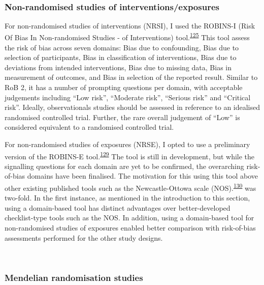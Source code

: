 \documentclass[a4paper, twoside]{templates/ociamthesis}
\begin{document}
~

\hypertarget{non-randomised-studies-of-interventionsexposures}{%
\subsubsection{Non-randomised studies of interventions/exposures}\label{non-randomised-studies-of-interventionsexposures}}

For non-randomised studies of interventions (NRSI), I used the ROBINS-I (Risk Of Bias In Non-randomised Studies - of Interventions) tool.\textsuperscript{\protect\hyperlink{ref-sterne2016}{125}} This tool assess the risk of bias across seven domains: Bias due to confounding, Bias due to selection of participants, Bias in classification of interventions, Bias due to deviations from intended interventions, Bias due to missing data, Bias in measurement of outcomes, and Bias in selection of the reported result. Similar to RoB 2, it has a number of prompting questions per domain, with acceptable judgements including ``Low risk'', ``Moderate risk'', ``Serious risk'' and ``Critical risk''. Ideally, observationals studies should be assessed in reference to an idealised randomised controlled trial. Further, the rare overall judgement of ``Low'' is considered equivalent to a randomised controlled trial.

For non-randomised studies of exposures (NRSE), I opted to use a preliminary version of the ROBINS-E tool.\textsuperscript{\protect\hyperlink{ref-morganr2020}{129}} The tool is still in development, but while the signalling questions for each domain are yet to be confirmed, the overarching risk-of-bias domains have been finalised. The motivation for this using this tool above other existing published tools such as the Newcastle-Ottowa scale (NOS).\textsuperscript{\protect\hyperlink{ref-wells2000}{130}} was two-fold. In the first instance, as mentioned in the introduction to this section, using a domain-based tool has distinct advantages over better-developed checklist-type tools such as the NOS. In addition, using a domain-based tool for non-randomised studies of exposures enabled better comparison with risk-of-bias assessments performed for the other study designs.

~

\hypertarget{mendelian-randomisation-studies}{%
\subsubsection{Mendelian randomisation studies}\label{mendelian-randomisation-studies}}
\end{document}
